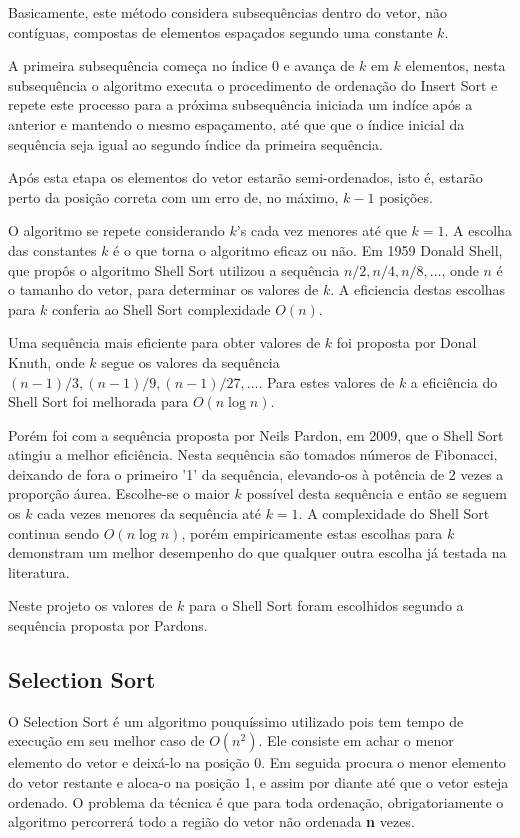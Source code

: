\documentclass[11pt, brazil, a4paper, usenames, svgnames, dvipsnames]{article}
\begin{document}
Basicamente, este método considera subsequências
dentro do vetor, não contíguas, compostas de elementos espaçados segundo uma constante $k$.

A primeira subsequência começa no índice $0$ e avança de $k$ em $k$ elementos, nesta subsequência
o algoritmo executa o procedimento de ordenação do Insert Sort e repete este processo para a
próxima subsequência iniciada um indíce após a anterior e mantendo o mesmo espaçamento, até que
que o índice inicial da sequência seja igual ao segundo índice da primeira sequência.

Após esta etapa os elementos do vetor estarão semi-ordenados, isto é, estarão perto da
posição correta com um erro de, no máximo, $k-1$ posições.

O algoritmo se repete considerando $k$'s cada vez menores até que $k=1$. A escolha das constantes
$k$ é o que torna o algoritmo eficaz ou não. Em 1959 Donald Shell, que propôs o algoritmo Shell Sort
utilizou a sequência $n/2, n/4, n/8, \ldots$, onde $n$ é o tamanho do vetor, para determinar
os valores de $k$. A eficiencia destas escolhas para $k$ conferia ao Shell Sort complexidade
$O(n)$.

Uma sequência mais eficiente para obter valores de $k$ foi proposta
por Donal Knuth, onde $k$ segue os valores da sequência $(n-1)/3, (n-1)/9, (n-1)/27, \ldots$.
Para estes valores de $k$ a eficiência do Shell Sort foi melhorada para $O(n \log{n})$.

Porém foi com a sequência proposta por Neils Pardon, em 2009, que o Shell Sort
atingiu a melhor eficiência. Nesta sequência são tomados números de Fibonacci,
deixando de fora o primeiro '1' da sequência, elevando-os à potência de 2 vezes
a proporção áurea. Escolhe-se o maior $k$ possível desta sequência e então se
seguem os $k$ cada vezes menores da sequência até $k=1$. A complexidade do Shell
Sort continua sendo $O(n \log{n})$, porém empiricamente estas escolhas para $k$ demonstram
um melhor desempenho do que qualquer outra escolha já testada na literatura.

Neste projeto os valores de $k$ para o Shell Sort foram escolhidos segundo a
sequência proposta por Pardons.


\subsection{Selection Sort}

O Selection Sort é um algoritmo pouquíssimo utilizado pois tem tempo de execução em seu melhor caso de $O(n^2)$. Ele consiste em achar o menor elemento do vetor e deixá-lo na posição 0. Em seguida procura o menor elemento do vetor restante e aloca-o na posição 1, e assim por diante até que o vetor esteja ordenado. O problema da técnica é que para toda ordenação, obrigatoriamente o algoritmo percorrerá todo a região do vetor não ordenada \textbf{n} vezes.
\end{document}
